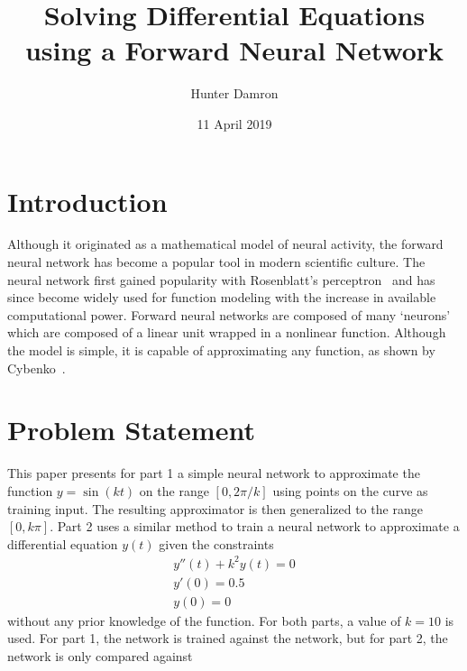 \documentclass{article}
\title{Solving Differential Equations using a Forward Neural Network}
\author{Hunter Damron}
\date{11 April 2019}
\begin{document}
    \maketitle

    \section{Introduction}
        Although it originated as a mathematical model of neural activity, the forward neural network has become a popular tool in modern scientific culture. The neural network first gained popularity with Rosenblatt's perceptron~\cite{rosenblatt} and has since become widely used for function modeling with the increase in available computational power. Forward neural networks are composed of many `neurons' which are composed of a linear unit wrapped in a nonlinear function. Although the model is simple, it is capable of approximating any function, as shown by Cybenko~\cite{approx}.

    \section{Problem Statement}
        This paper presents for part 1 a simple neural network to approximate the function $y = \sin(kt)$ on the range $[0,2\pi/k]$ using points on the curve as training input. The resulting approximator is then generalized to the range $[0,k\pi]$. Part 2 uses a similar method to train a neural network to approximate a differential equation $y(t)$ given the constraints
        \begin{equation}\label{eqn:ode}
        \begin{gathered}
            y''(t) + k^2 y(t) = 0 \\
            y'(0) = 0.5 \\
            y(0) = 0
        \end{gathered}
        \end{equation}
        without any prior knowledge of the function. For both parts, a value of $k=10$ is used. For part 1, the network is trained against the network, but for part 2, the network is only compared against
\end{document}
